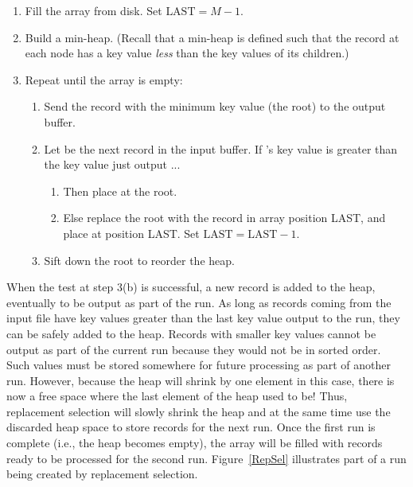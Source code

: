 \begin{enumerate}

\item Fill the array from disk.  Set \(\mbox{LAST} = M-1\).

\item Build a min-heap.
(Recall that a min-heap is defined such that the
record at each node has a key value \emph{less} than the key values of
its children.)

\item Repeat until the array is empty:

\begin{enumerate}

\item Send the record with the minimum key value (the root) to the
output buffer.

\item Let  be the next record in the input buffer.
If 's key value is greater than the key value just output ...

\begin{enumerate}
\item Then place  at the root.

\item Else replace the root with the record in array position
LAST, and place  at position LAST.
Set \(\mbox{LAST} = \mbox{LAST} - 1\).

\end{enumerate}

\item Sift down the root to reorder the heap.

\end{enumerate}

\end{enumerate}

When the test at step 3(b) is successful, a new record is added
to the heap, eventually to be output as part of the run.
As long as records coming from the input file have key values
greater than the last key value output to the run, they can be safely
added to the heap.
Records with smaller key values cannot be output as
part of the current run because they would not be in sorted order.
Such values must be stored somewhere for future processing as part of
another run.
However, because the heap will shrink by one element in this case,
there is now a free space where the last element of the heap used to
be!
Thus, replacement selection will slowly shrink the heap and at the
same time use the discarded heap space to store records for the next
run.
Once the first run is complete (i.e., the heap becomes empty), the
array will be filled with records ready to be processed for the second
run.
Figure~\ref{RepSel} illustrates part of a run being created by
replacement selection.

